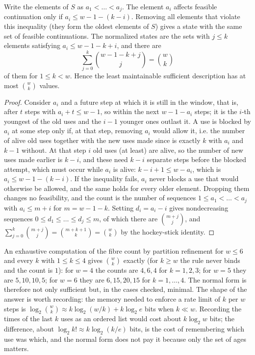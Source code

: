 \begin{newresult}\label{prop:rate-normal}
Write the elements of $S$ as $a_1<\dots<a_j$. The element $a_i$ affects feasible continuation only if $a_i\le w-1-(k-i)$. Removing all elements that violate this inequality (they form the oldest elements of $S$) gives a state with the same set of feasible continuations. The normalized states are the sets with $j\le k$ elements satisfying $a_i\le w-1-k+i$, and there are
\[
\sum_{j=0}^{k}\binom{w-1-k+j}{j}=\binom{w}{k}
\]
of them for $1\le k<w$. Hence the least maintainable sufficient description has at most $\binom wk$ values.
\end{newresult}
\begin{proof}
Consider $a_i$ and a future step at which it is still in the window, that is, after $t$ steps with $a_i+t\le w-1$, so within the next $w-1-a_i$ steps; it is the $i$-th youngest of the old uses and the $i-1$ younger ones outlast it. A use is blocked by $a_i$ at some step only if, at that step, removing $a_i$ would allow it, i.e. the number of alive old uses together with the new uses made since is exactly $k$ with $a_i$ and $k-1$ without. At that step $i$ old uses (at least) are alive, so the number of new uses made earlier is $k-i$, and these need $k-i$ separate steps before the blocked attempt, which must occur while $a_i$ is alive: $k-i+1\le w-a_i$, which is $a_i\le w-1-(k-i)$. If the inequality fails, $a_i$ never blocks a use that would otherwise be allowed, and the same holds for every older element. Dropping them changes no feasibility, and the count is the number of sequences $1\le a_1<\dots<a_j$ with $a_i\le m+i$ for $m=w-1-k$. Setting $d_i=a_i-i$ gives nondecreasing sequences $0\le d_1\le\dots\le d_j\le m$, of which there are $\binom{m+j}{j}$, and $\sum_{j=0}^k\binom{m+j}{j}=\binom{m+k+1}{k}=\binom wk$ by the hockey-stick identity.
\end{proof}

An exhaustive computation of the fibre count by partition refinement for $w\le6$ and every $k$ with $1\le k\le4$ gives $\binom wk$ exactly (for $k\ge w$ the rule never binds and the count is $1$): for $w=4$ the counts are $4,6,4$ for $k=1,2,3$; for $w=5$ they are $5,10,10,5$; for $w=6$ they are $6,15,20,15$ for $k=1,\dots,4$. The normal form is therefore not only sufficient but, in the cases checked, minimal. The shape of the answer is worth recording: the memory needed to enforce a rate limit of $k$ per $w$ steps is $\log_2\binom wk\approx k\log_2(w/k)+k\log_2e$ bits when $k\ll w$. Recording the times of the last $k$ uses as an ordered list would cost about $k\log_2w$ bits; the difference, about $\log_2k!\approx k\log_2(k/e)$ bits, is the cost of remembering which use was which, and the normal form does not pay it because only the set of ages matters.

